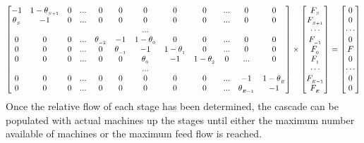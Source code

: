  \begin{equation}
 \setcounter{MaxMatrixCols}{20}
 \begin{bmatrix}
     -1        & 1-\theta_{_{S+1}} & 0 & ... & 0              & 0              & 0                 & 0                 & 0                 & ... & 0               & 0 \\
 \theta_{_{S}} & -1                & 0 & ... & 0              & 0              & 0                 & 0                 & 0                 & ... & 0               & 0 \\
               &                   &   &     &                &                & ...               &                   &                   &     &                 &   \\
 0             & 0                 & 0 & ... & \theta_{_{-2}} & -1             & 1 - \theta_{_{0}} & 0                 & 0                 & ... & 0               & 0 \\
 0             & 0                 & 0 & ... & 0              & \theta_{_{-1}} & -1                & 1 - \theta_{_{1}} & 0                 & ... & 0               & 0 \\
 0             & 0                 & 0 & ... & 0              & 0              & \theta_{_{0}}     & -1                & 1 - \theta_{_{2}} & 0   & ...             & 0 \\
               &                   &   &     &                &                & ...               &                   &                   &     &                 &   \\
 0             & 0                 & 0 & ... & 0              & 0              & 0                 & 0                 & 0                 & ... & -1              & 1-\theta_{_{E}} \\
 0             & 0                 & 0 & ... & 0              & 0              & 0                 & 0                 & 0                 & ... & \theta_{_{E-1}} & -1
 \end{bmatrix}
 \times
 \begin{bmatrix}
     F_{_{S}}   \\
     F_{_{S+1}} \\
     \cdots     \\
     F_{_{-1}}  \\
     F_{_{0} }  \\
     F_{_{1} }  \\
     \cdots     \\
     F_{_{E-1}} \\
     F_{_{E}}
 \end{bmatrix}
 =
 \begin{bmatrix}
     0      \\
     0      \\
     \cdots \\
     0      \\
     F      \\
     0      \\
     \cdots \\
     0      \\
     0
 \end{bmatrix}
 \label{eq:flow}
 \end{equation}
Once the relative flow of each stage has been determined, the
cascade can be populated with actual machines up the stages
until either the maximum number available of machines or the maximum feed
flow is reached.
